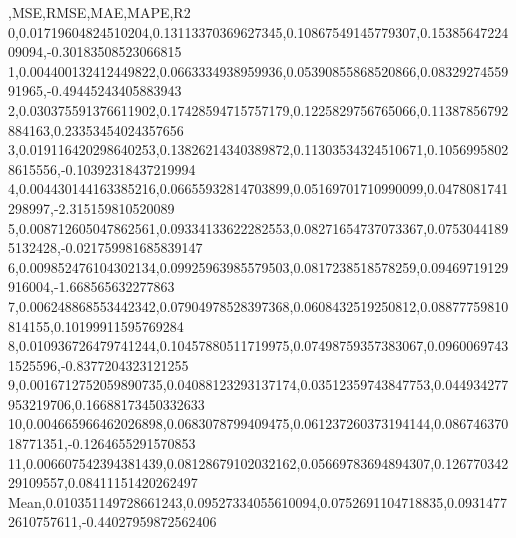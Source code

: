 ,MSE,RMSE,MAE,MAPE,R2
0,0.01719604824510204,0.13113370369627345,0.10867549145779307,0.1538564722409094,-0.30183508523066815
1,0.004400132412449822,0.0663334938959936,0.05390855868520866,0.0832927455991965,-0.49445243405883943
2,0.030375591376611902,0.17428594715757179,0.1225829756765066,0.11387856792884163,0.23353454024357656
3,0.019116420298640253,0.13826214340389872,0.11303534324510671,0.10569958028615556,-0.10392318437219994
4,0.004430144163385216,0.06655932814703899,0.05169701710990099,0.0478081741298997,-2.315159810520089
5,0.008712605047862561,0.09334133622282553,0.08271654737073367,0.07530441895132428,-0.021759981685839147
6,0.009852476104302134,0.09925963985579503,0.0817238518578259,0.09469719129916004,-1.668565632277863
7,0.006248868553442342,0.07904978528397368,0.0608432519250812,0.08877759810814155,0.10199911595769284
8,0.010936726479741244,0.10457880511719975,0.07498759357383067,0.09600697431525596,-0.8377204323121255
9,0.0016712752059890735,0.04088123293137174,0.03512359743847753,0.044934277953219706,0.16688173450332633
10,0.004665966462026898,0.0683078799409475,0.061237260373194144,0.08674637018771351,-0.1264655291570853
11,0.006607542394381439,0.08128679102032162,0.05669783694894307,0.12677034229109557,0.08411151420262497
Mean,0.010351149728661243,0.09527334055610094,0.0752691104718835,0.09314772610757611,-0.44027959872562406
